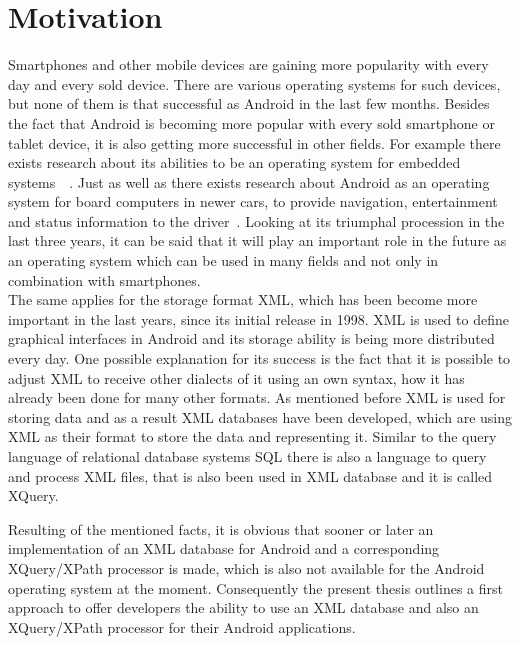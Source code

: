 \section{Motivation}
\label{sec:introduction:motivation}
Smartphones and other mobile devices are gaining more popularity with every day and every sold device.
There are various operating systems for such devices, but none of them is that successful as Android in the last few months.
Besides the fact that Android is becoming more popular with every sold smartphone or tablet device, it is also getting more successful in other fields.
For example there exists research about its abilities to be an operating system for embedded systems~\cite{lee2010evaluating}~\cite{maia2010evaluating}.
Just as well as there exists research about Android as an operating system for board computers in newer cars, to provide navigation, entertainment and status information to the driver~\cite{macario2009vehicle}.
Looking at its triumphal procession in the last three years, it can be said that it will play an important role in the future as an operating system which can be used in many fields and not only in combination with smartphones.\\
The same applies for the storage format XML, which has been become more important in the last years, since its initial release in 1998.
XML is used to define graphical interfaces in Android and its storage ability is being more distributed every day.
One possible explanation for its success is the fact that it is possible to adjust XML to receive other dialects of it using an own syntax, how it has already been done for many other formats.
As mentioned before XML is used for storing data and as a result XML databases have been developed, which are using XML as their format to store the data and representing it.
Similar to the query language of relational database systems SQL there is also a language to query and process XML files, that is also been used in XML database and it is called XQuery.




Resulting of the mentioned facts, it is obvious that sooner or later an implementation of an XML database for Android and a corresponding XQuery/XPath processor is made, which is also not available for the Android operating system at the moment.
Consequently the present thesis outlines a first approach to offer developers the ability to use an XML database and also an XQuery/XPath processor for their Android applications.



